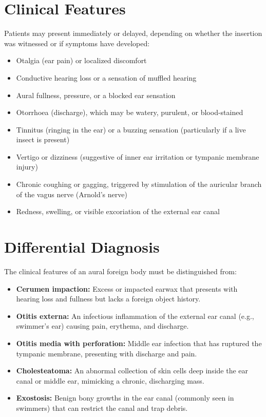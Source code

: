\section*{Clinical Features}
Patients may present immediately or delayed, depending on whether the insertion was witnessed or if symptoms have developed:
\begin{itemize}
    \item Otalgia (ear pain) or localized discomfort
    \item Conductive hearing loss or a sensation of muffled hearing
    \item Aural fullness, pressure, or a blocked ear sensation
    \item Otorrhoea (discharge), which may be watery, purulent, or blood-stained
    \item Tinnitus (ringing in the ear) or a buzzing sensation (particularly if a live insect is present)
    \item Vertigo or dizziness (suggestive of inner ear irritation or tympanic membrane injury)
    \item Chronic coughing or gagging, triggered by stimulation of the auricular branch of the vagus nerve (Arnold's nerve)
    \item Redness, swelling, or visible excoriation of the external ear canal
\end{itemize}

\section*{Differential Diagnosis}
The clinical features of an aural foreign body must be distinguished from:
\begin{itemize}
    \item \textbf{Cerumen impaction:} Excess or impacted earwax that presents with hearing loss and fullness but lacks a foreign object history.
    \item \textbf{Otitis externa:} An infectious inflammation of the external ear canal (e.g., swimmer's ear) causing pain, erythema, and discharge.
    \item \textbf{Otitis media with perforation:} Middle ear infection that has ruptured the tympanic membrane, presenting with discharge and pain.
    \item \textbf{Cholesteatoma:} An abnormal collection of skin cells deep inside the ear canal or middle ear, mimicking a chronic, discharging mass.
    \item \textbf{Exostosis:} Benign bony growths in the ear canal (commonly seen in swimmers) that can restrict the canal and trap debris.
\end{itemize}

